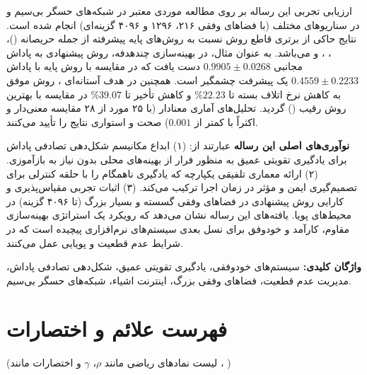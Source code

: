 \documentclass[12pt,a4paper]{report} %
\begin{document}
ارزیابی تجربی این رساله بر روی مطالعه موردی معتبر  در شبکه‌های حسگر بی‌سیم و در سناریوهای مختلف (با فضاهای وفقی ۲۱۶، ۱۲۹۶ و ۴۰۹۶ گزینه‌ای) انجام شده است. نتایج حاکی از برتری قاطع روش  نسبت به روش‌های پایه پیشرفته از جمله  حریصانه ()، ، ،  و  می‌باشد. به عنوان مثال، در بهینه‌سازی چندهدفه، روش پیشنهادی به پاداش مجانبی $0.9905 \pm 0.0268$ دست یافت که در مقایسه با روش  پایه با پاداش $0.4559 \pm 0.2233$ یک پیشرفت چشمگیر است. همچنین در هدف آستانه‌ای ، روش  موفق به کاهش نرخ اتلاف بسته تا $22.23$\% و کاهش تأخیر تا $39.07$\% در مقایسه با بهترین روش رقیب () گردید. تحلیل‌های آماری معنادار (با ۲۵ مورد از ۲۸ مقایسه معنی‌دار و اکثراً با  کمتر از $0.001$) صحت و استواری نتایج را تأیید می‌کنند.

\textbf{نوآوری‌های اصلی این رساله} عبارتند از: (۱) ابداع مکانیسم شکل‌دهی تصادفی پاداش برای یادگیری تقویتی عمیق به منظور فرار از بهینه‌های محلی بدون نیاز به بازآموزی. (۲) ارائه معماری تلفیقی یکپارچه که یادگیری ناهمگام  را با حلقه کنترلی  برای تصمیم‌گیری ایمن و مؤثر در زمان اجرا ترکیب می‌کند. (۳) اثبات تجربی مقیاس‌پذیری و کارایی روش پیشنهادی در فضاهای وفقی گسسته و بسیار بزرگ (تا ۴۰۹۶ گزینه) در محیط‌های پویا. یافته‌های این رساله نشان می‌دهد که رویکرد  یک استراتژی بهینه‌سازی مقاوم، کارآمد و خودوفق برای نسل بعدی سیستم‌های نرم‌افزاری پیچیده است که در شرایط عدم قطعیت و پویایی عمل می‌کنند.

\medskip
\noindent\textbf{واژگان کلیدی:} سیستم‌های خودوفقی، یادگیری تقویتی عمیق، شکل‌دهی تصادفی پاداش، مدیریت عدم قطعیت، فضاهای وفقی بزرگ، اینترنت اشیاء، شبکه‌های حسگر بی‌سیم.

\newpage

\tableofcontents
\newpage

\listoftables
{}
\newpage

\listoffigures
{}
\newpage

\chapter*{فهرست علائم و اختصارات}
(لیست نمادهای ریاضی مانند $\rho$، $\gamma$ و اختصارات مانند ، )
\newpage

\end{document}
